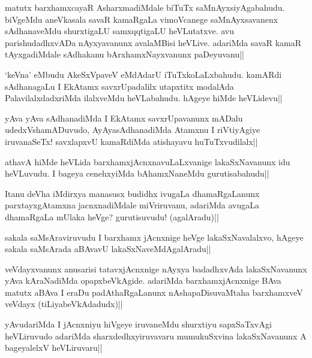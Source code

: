 \begin{artha}%
matutx barxhamxcayaR AsharxmadiMdale biTuTx saMnAyxsiyAgabahudu. biVgeMdu aneVkasala savaR kamaRgaLa vimoVcanege saMnAyxsavanenx sAdhanaveMdu shurxtigaLU samxqqtigaLU heVLutatxve. avu parishudadhxvADa nAyxyavanunx avalaMBisi heVLive. adariMda savaR kamaR tAyxgadiMdale sAdhakanu bArxhamxNayxvanunx paDeyuvanu||
\end{artha}

\begin{artha}
`keVna' eMbudu AkeSxVpaveV eMdAdarU iTuTxkoLaLxbahudu. kamARdi sAdhanagaLu I EkAtamx savxrUpadalilx utapxtitx modalAda PalavilalxdadxriMda ilalxveMdu heVLabahudu. hAgeye hiMde heVLidevu||
\end{artha}


\begin{artha}
yAva yAva sAdhanadiMda I EkAtamx savxrUpavanunx mADalu udedxVshamADuvudo, AyAyasAdhanadiMda Atamxnu I riVtiyAgiye iruvanaSeTx! savxlapxvU kamaRdiMda atishayavu huTuTxvudilalx||
\end{artha}

\begin{artha}%
athavA hiMde heVLida barxhamxjAcnxnavuLaLxvanige lakaSxNavanunx idu heVLuvudu. I bageya cenehxyiMda bAhamxNaneMdu gurutisabahudu||
\end{artha}

\begin{artha}
Itanu deVha iMdirxya manasusx budidhx ivugaLa dhamaRgaLanunx parxtayxgAtamxna jacnxnadiMdale miVriruvanu, adariMda avugaLa dhamaRgaLa mUlaka heVge? gurutisuvudu! (agalAradu)||
\end{artha}

\begin{artha}
sakala saMsAraviruvudu I barxhamx jAcnxnige heVge lakaSxNavalalxvo, hAgeye sakala saMsArada aBAvavU lakaSxNaveMdAgalAradu||
\end{artha}


\begin{artha}
veVdayxvanunx anusarisi tatavxjAcnxnige nAyxya badadhxvAda lakaSxNavanunx yAva kAraNadiMda opapxbeVkAgide. adariMda barxhamxjAcnxnige BAva matutx aBAva I eraDu padAthaRgaLanunx nAshapaDisuvaMtaha barxhamxveV veVdayx (tiLiyabeVkAdadudx)||
\end{artha}

\begin{artha}
yAvudariMda I jAcnxniyu hiVgeye iruvaneMdu shurxtiyu sapxSaTxvAgi heVLiruvudo adariMda sharxdedhxyiruvavaru mumukuSxvina lakaSxNavanunx A bageyalelxV heVLiruvaru||
\end{artha}%

